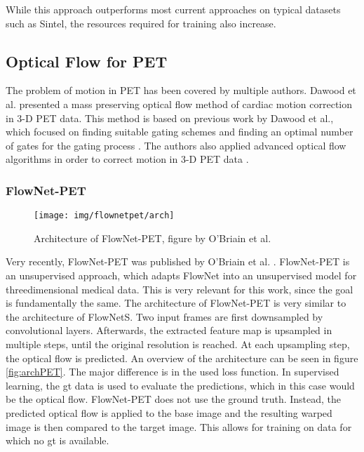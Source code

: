 While this approach outperforms most current approaches on typical datasets such as Sintel\cite{MPISintelDataset}, the resources required for training also increase. 



\subsection{Optical Flow for PET}
The problem of motion in PET has been covered by multiple authors. 
Dawood et al. presented a mass preserving optical flow method of cardiac motion correction in 3-D PET data\cite{dawoodMassConservationbasedOptical2013}. 
This method is based on previous work by Dawood et al., which focused on finding suitable gating schemes\cite{dawoodLungMotionCorrection2006} and finding an optimal number of gates for the gating
process \cite{dawoodOptimalNumberRespiratory2009}. The authors also applied advanced optical flow algorithms in order to correct motion in 3-D PET data \cite{dawoodRespiratoryMotionCorrection2008}.
\subsubsection{FlowNet-PET}
\begin{figure}
	\centering
	\texttt{[image: img/flownetpet/arch]}
	\caption{Architecture of FlowNet-PET, figure by O'Briain et al. \cite{obriainFlowNetPETUnsupervisedLearning2022} }
	\label{fig:archPET}
\end{figure}

Very recently, FlowNet-PET was published by O'Briain et al. \cite{obriainFlowNetPETUnsupervisedLearning2022}. FlowNet-PET is an unsupervised approach, which adapts FlowNet into an unsupervised model for threedimensional medical data. This is very relevant for this work, since the goal is fundamentally the same. 
The architecture of FlowNet-PET is very similar to the architecture of FlowNetS.
Two input frames are first downsampled by convolutional layers. Afterwards, the extracted feature map is upsampled in multiple steps, until the original resolution is reached. At each upsampling step, the optical flow is predicted. An overview of the architecture can be seen in figure \eqref{fig:archPET}. The major difference is in the used loss function. In supervised learning, the \acs{gt} data is used to evaluate the predictions, which in this case would be the optical flow.  FlowNet-PET does not use the ground truth. Instead, the predicted optical flow is applied to the base image and the resulting warped image is then compared to the target image. This allows for training on data for which no \acs{gt} is available.


